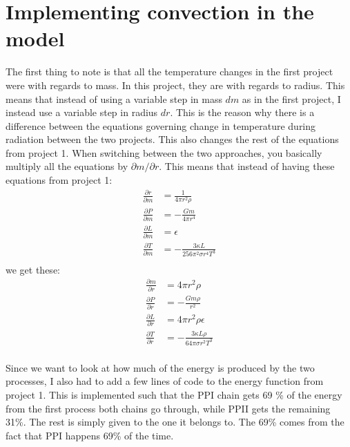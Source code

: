 \documentclass[a4paper,12pt]{article}
\begin{document}
\section{Implementing convection in the model}
The first thing to note is that all the temperature changes in the first project were with regards to mass. In this project, they are with regards to radius.
This means that instead of using a variable step in mass $dm$ as in the first project, I instead use a variable step in radius $dr$.
This is the reason why there is a difference between the equations governing change in temperature during radiation between the two projects.
This also changes the rest of the equations from project 1. When switching between the two approaches, you basically multiply all the equations by $\partial m/\partial r$.
This means that instead of having these equations from project 1:
\begin{equation*}
\begin{aligned}
\frac{\partial r}{\partial m} &= \frac{1}{4\pi r^2\rho}\\
\frac{\partial P}{\partial m} &= -\frac{Gm}{4\pi r^4}\\
\frac{\partial L}{\partial m} &= \epsilon\\
\frac{\partial T}{\partial m} &= -\frac{3\kappa L }{256\pi^2\sigma r^4 T^3}\\
\end{aligned}
\end{equation*}
we get these:
\begin{equation*}
\begin{aligned}
\frac{\partial m}{\partial r} &= 4\pi r^2\rho\\
\frac{\partial P}{\partial r} &= -\frac{Gm\rho}{r^2}\\
\frac{\partial L}{\partial r} &= 4\pi r^2\rho\epsilon\\
\frac{\partial T}{\partial r} &= -\frac{3\kappa L\rho }{64\pi\sigma r^2 T^3}\\
\end{aligned}
\end{equation*}

Since we want to look at how much of the energy is produced by the two processes, I also had to add a few lines of code to the energy function from project 1. This is implemented such that the PPI chain gets 69 \% of the energy from the first process both chains go through, while PPII gets the remaining 31\%. The rest is simply given to the one it belongs to. The 69\% comes from the fact that PPI happens 69\% of the time.
\end{document}
